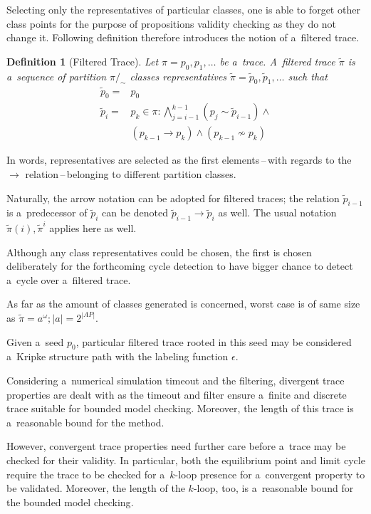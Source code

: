 \documentclass[12pt,twoside,draft]{fithesis}
\newtheorem{mydef}{Definition}
\begin{document}
Selecting only the representatives of particular classes, one is able to
forget other class points for the purpose of propositions validity
checking as they do not change it. Following definition therefore
introduces the notion of a~filtered trace.
\begin{mydef}[Filtered Trace] Let $\pi=p_0,p_1,\dotsc$ be a~trace.
A~filtered trace $\tilde{\pi}$ is a~sequence of partition
$\pi/_{\sim}$ classes representatives
$\tilde{\pi}=\tilde{p}_0,\tilde{p}_1,\dotsc$ such that
\begin{align}
\tilde{p}_{0}=&p_0\\
\tilde{p}_{i}=&p_k\in\pi:\bigwedge_{j=i-1}^{k-1}\left(
	p_j\sim \tilde{p}_{i-1}\right)
	\wedge\nonumber\\
	&(p_{k-1}\rightarrow p_{k})\wedge(p_{k-1}\not\sim p_{k})
\end{align}
\end{mydef}
In words, representatives are selected as the first elements\,--\,with
regards to the $\rightarrow$ relation\,--\,belonging to different
partition classes. 

Naturally, the arrow notation can be adopted for filtered traces;
the relation $\tilde{p}_{i-1}$ is a~predecessor of $\tilde{p}_{i}$ can
be denoted $\tilde{p}_{i-1}\rightarrow\tilde{p}_{i}$ as well. The usual
notation $\tilde{\pi}(i),\tilde{\pi}^i$ applies here as well.

Although any class representatives could be chosen, the first is chosen
deliberately for the forthcoming cycle detection to have bigger chance
to detect a~cycle over a~filtered trace.

As far as the amount of classes generated is concerned, worst case is
of same size as $\tilde{\pi}=a^\omega; |a|=2^{|AP|}$.

Given a~seed $p_0$, particular filtered trace rooted in this seed may be
considered a~Kripke structure path with the labeling function
$\epsilon$.

Considering a~numerical simulation timeout and the filtering,
divergent trace properties are dealt with as the timeout and filter
ensure a~finite and discrete trace suitable for bounded model checking.
Moreover, the length of this trace is a~reasonable bound for the method\cite{biere}.

However, convergent trace properties need further care before a~trace
may be checked for their validity. In particular, both the equilibrium
point and limit cycle require the trace to be checked for a~$k$-loop
presence for a~convergent property to be validated. Moreover, the length
of the $k$-loop, too, is a~reasonable bound for the bounded model
checking\cite{biere}.
\end{document}

